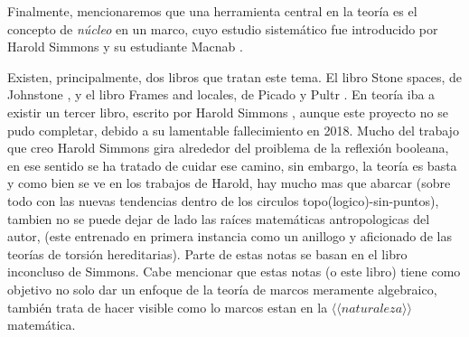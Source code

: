 Finalmente, mencionaremos que una herramienta central
en la teoría es el concepto de \emph{núcleo} en un marco,
cuyo estudio sistemático fue introducido por Harold Simmons \cite{simmons1978framework}
y su estudiante Macnab \cite{macnab198110}.

Existen, principalmente, dos libros que tratan este tema.
El libro Stone spaces, de Johnstone \cite{johnstone1986stone},
y el libro Frames and locales, de Picado y Pultr \cite{PicadoPultr}.
En teoría iba a existir un tercer libro, escrito por Harold Simmons ,
aunque este proyecto no se pudo completar, debido a su
lamentable fallecimiento en 2018. Mucho del trabajo que creo Harold Simmons gira alrededor del proiblema de la reflexión booleana, en ese sentido se ha tratado de cuidar ese camino, sin embargo, la teoría es basta y como bien se ve en los trabajos de Harold, hay mucho mas que abarcar (sobre todo con las nuevas tendencias dentro de los circulos topo(logico)-sin-puntos), tambien no se puede dejar de lado las raíces matemáticas antropologicas del autor, 
(este entrenado en primera instancia como un anillogo y aficionado de las teorías de torsión hereditarias).
Parte de estas notas se basan en el libro inconcluso de Simmons. 
Cabe mencionar que estas notas (o este libro) tiene como objetivo no solo dar un enfoque de la teoría de marcos meramente algebraico, también trata de hacer visible como lo marcos 
estan en la $\langle \langle naturaleza \rangle \rangle$ matemática. 



